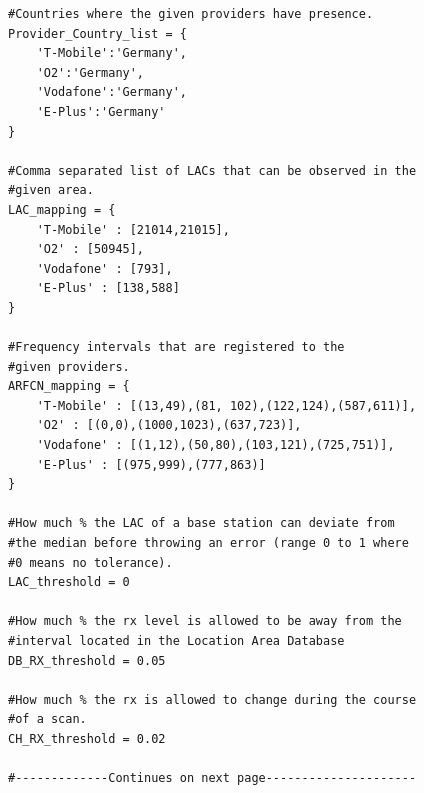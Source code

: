 \begin{minipage}{\dimexpr\textwidth-4\fboxsep-2\fboxrule} 
\begin{lstlisting}
#Countries where the given providers have presence.
Provider_Country_list = {
    'T-Mobile':'Germany',
    'O2':'Germany',
    'Vodafone':'Germany',
    'E-Plus':'Germany'
}

#Comma separated list of LACs that can be observed in the
#given area.
LAC_mapping = {
    'T-Mobile' : [21014,21015],
    'O2' : [50945],
    'Vodafone' : [793],
    'E-Plus' : [138,588]
}

#Frequency intervals that are registered to the 
#given providers.
ARFCN_mapping = {
    'T-Mobile' : [(13,49),(81, 102),(122,124),(587,611)],
    'O2' : [(0,0),(1000,1023),(637,723)],
    'Vodafone' : [(1,12),(50,80),(103,121),(725,751)],
    'E-Plus' : [(975,999),(777,863)]
}

#How much % the LAC of a base station can deviate from
#the median before throwing an error (range 0 to 1 where
#0 means no tolerance).
LAC_threshold = 0

#How much % the rx level is allowed to be away from the
#interval located in the Location Area Database
DB_RX_threshold = 0.05

#How much % the rx is allowed to change during the course
#of a scan.
CH_RX_threshold = 0.02

#-------------Continues on next page---------------------


\end{lstlisting}
\end{minipage}\\\\
\hspace*{\dimexpr\fboxsep+\fboxrule}%
